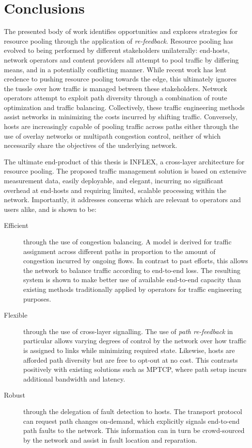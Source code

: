\chapter{Conclusions}
\label{chapter:conclusions}

The presented body of work identifies opportunities and explores strategies for resource pooling through the application of \emph{re-feedback}.
Resource pooling has evolved to being performed by different stakeholders unilaterally: end-hosts, network operators and content providers all attempt to pool traffic by differing means, and in a potentially conflicting manner.
While recent work has lent credence to pushing resource pooling towards the edge, this ultimately ignores the tussle over how traffic is managed between these stakeholders.
Network operators attempt to exploit path diversity through a combination of route optimization and traffic balancing.
Collectively, these traffic engineering methods assist networks in minimizing the costs incurred by shifting traffic.
Conversely, hosts are increasingly capable of pooling traffic across paths either through the use of overlay networks or multipath congestion control, neither of which necessarily share the objectives of the underlying network.

The ultimate end-product of this thesis is INFLEX, a cross-layer architecture for resource pooling.
The proposed traffic management solution is based on extensive measurement data, easily deployable, and elegant, incurring no significant overhead at end-hosts and requiring limited, scalable processing within the network.
Importantly, it addresses concerns which are relevant to operators and users alike, and is shown to be:

\renewcommand{\descriptionlabel}[1]{\hspace{\labelsep}\textbf{#1}}
\begin{description}
\item[Efficient] through the use of congestion balancing. A model is derived for traffic assignment across different paths in proportion to the amount of congestion incurred by ongoing flows. In contrast to past efforts, this allows the network to balance traffic according to end-to-end loss. The resulting system is shown to make better use of available end-to-end capacity than existing methods traditionally applied by operators for traffic engineering purposes.
\item[Flexible] through the use of cross-layer signalling. The use of \emph{path re-feedback} in particular allows varying degrees of control by the network over how traffic is assigned to links while minimizing required state. Likewise, hosts are afforded path diversity but are free to opt-out at no cost. This contrasts positively with existing solutions such as \ac{MPTCP}, where path setup incurs additional bandwidth and latency.
\item[Robust] through the delegation of fault detection to hosts. The transport protocol can request path changes on-demand, which explicitly signals end-to-end path faults to the network. This information can in turn be crowd-sourced by the network and assist in fault location and reparation.
\end{description}


